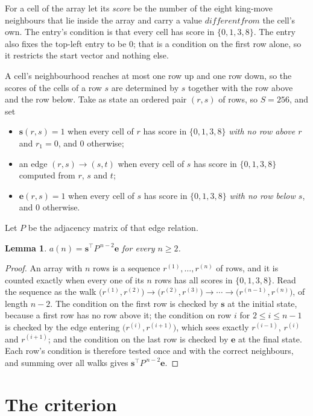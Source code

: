 \documentclass[11pt,a4paper]{article}
\theoremstyle{plain}
\newtheorem{lemma}[theorem]{Lemma}
\theoremstyle{definition}
\begin{document}
For a cell of the array let its \emph{score} be the number of the eight king-move neighbours that lie inside
the array and carry a value $different from$ the cell's own. The entry's condition is that every cell
has score in $\{0,1,3,8\}$. The entry also fixes the top-left entry to be $0$; that is a condition on the first row alone, so it restricts the start vector and nothing else.

A cell's neighbourhood reaches at most one row up and one row down, so the scores of the
cells of a row $s$ are determined by $s$ together with the row above and the row below.
Take as state an ordered pair $(r,s)$ of rows, so $S=256$, and set
\begin{itemize}
\item $\mathbf{s}(r,s)=1$ when every cell of $r$ has score in $\{0,1,3,8\}$ \emph{with no row
above $r$} and $r_1=0$, and $0$ otherwise;
\item an edge $(r,s)\to(s,t)$ when every cell of $s$ has score in $\{0,1,3,8\}$ computed from
$r$, $s$ and $t$;
\item $\mathbf{e}(r,s)=1$ when every cell of $s$ has score in $\{0,1,3,8\}$ \emph{with no row
below $s$}, and $0$ otherwise.
\end{itemize}
Let $P$ be the adjacency matrix of that edge relation.

\begin{lemma}\label{lem:walk}
$a(n)=\mathbf{s}^{\!\top}P^{\,n-2}\mathbf{e}$ for every $n\ge2$.
\end{lemma}

\begin{proof}
An array with $n$ rows is a sequence $r^{(1)},\dots,r^{(n)}$ of rows, and it is counted
exactly when every one of its $n$ rows has all scores in $\{0,1,3,8\}$. Read the sequence as the
walk $\bigl(r^{(1)},r^{(2)}\bigr)\to\bigl(r^{(2)},r^{(3)}\bigr)\to\cdots\to
\bigl(r^{(n-1)},r^{(n)}\bigr)$, of length $n-2$. The condition on the first row is
checked by $\mathbf{s}$ at the initial state, because a first row has no row above it; the
condition on row $i$ for $2\le i\le n-1$ is checked by the edge entering
$\bigl(r^{(i)},r^{(i+1)}\bigr)$, which sees exactly $r^{(i-1)}$, $r^{(i)}$ and
$r^{(i+1)}$; and the condition on the last row is checked by $\mathbf{e}$ at the final
state. Each row's condition is therefore tested once and with the correct neighbours, and
summing over all walks gives $\mathbf{s}^{\!\top}P^{\,n-2}\mathbf{e}$.
\end{proof}

\section{The criterion}
\end{document}
